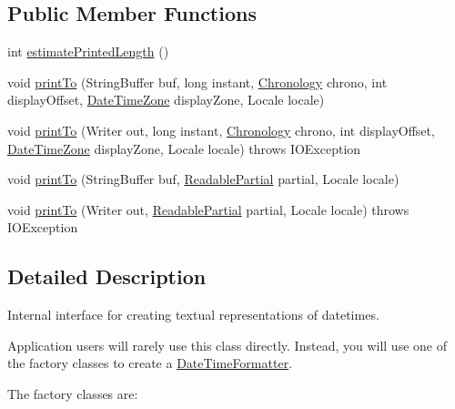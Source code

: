 \subsection*{Public Member Functions}
\begin{DoxyCompactItemize}
\item 
int \hyperlink{interfaceorg_1_1joda_1_1time_1_1format_1_1_date_time_printer_a624b487d64a49f23967edf978c52c007}{estimate\-Printed\-Length} ()
\item 
void \hyperlink{interfaceorg_1_1joda_1_1time_1_1format_1_1_date_time_printer_a32d0ed2c6241fb4c8c18b3907a8cc537}{print\-To} (String\-Buffer buf, long instant, \hyperlink{classorg_1_1joda_1_1time_1_1_chronology}{Chronology} chrono, int display\-Offset, \hyperlink{classorg_1_1joda_1_1time_1_1_date_time_zone}{Date\-Time\-Zone} display\-Zone, Locale locale)
\item 
void \hyperlink{interfaceorg_1_1joda_1_1time_1_1format_1_1_date_time_printer_abc26233d437d64fce59ffb065b374d3c}{print\-To} (Writer out, long instant, \hyperlink{classorg_1_1joda_1_1time_1_1_chronology}{Chronology} chrono, int display\-Offset, \hyperlink{classorg_1_1joda_1_1time_1_1_date_time_zone}{Date\-Time\-Zone} display\-Zone, Locale locale)  throws I\-O\-Exception
\item 
void \hyperlink{interfaceorg_1_1joda_1_1time_1_1format_1_1_date_time_printer_a1ec61fe305eff6cea266e0f22a947d1a}{print\-To} (String\-Buffer buf, \hyperlink{interfaceorg_1_1joda_1_1time_1_1_readable_partial}{Readable\-Partial} partial, Locale locale)
\item 
void \hyperlink{interfaceorg_1_1joda_1_1time_1_1format_1_1_date_time_printer_a2d90a20cb033d305f2de5c99466d08a4}{print\-To} (Writer out, \hyperlink{interfaceorg_1_1joda_1_1time_1_1_readable_partial}{Readable\-Partial} partial, Locale locale)  throws I\-O\-Exception
\end{DoxyCompactItemize}


\subsection{Detailed Description}
Internal interface for creating textual representations of datetimes. 

Application users will rarely use this class directly. Instead, you will use one of the factory classes to create a \hyperlink{classorg_1_1joda_1_1time_1_1format_1_1_date_time_formatter}{Date\-Time\-Formatter}. 

The factory classes are\-:\par

